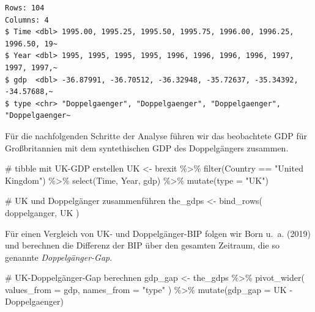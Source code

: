 \documentclass[
  a4paper,
  DIV=11,
  oneside]{scrreprt}
\newenvironment{Shaded}{\begin{snugshade}}{\end{snugshade}}
\newcommand{\AttributeTok}[1]{\textcolor[rgb]{0.40,0.45,0.13}{#1}}
\newcommand{\CommentTok}[1]{\textcolor[rgb]{0.37,0.37,0.37}{#1}}
\newcommand{\FunctionTok}[1]{\textcolor[rgb]{0.28,0.35,0.67}{#1}}
\newcommand{\NormalTok}[1]{\textcolor[rgb]{0.00,0.23,0.31}{#1}}
\newcommand{\OtherTok}[1]{\textcolor[rgb]{0.00,0.23,0.31}{#1}}
\newcommand{\SpecialCharTok}[1]{\textcolor[rgb]{0.37,0.37,0.37}{#1}}
\newcommand{\StringTok}[1]{\textcolor[rgb]{0.13,0.47,0.30}{#1}}
\begin{document}
\begin{verbatim}
Rows: 104
Columns: 4
$ Time <dbl> 1995.00, 1995.25, 1995.50, 1995.75, 1996.00, 1996.25, 1996.50, 19~
$ Year <dbl> 1995, 1995, 1995, 1995, 1996, 1996, 1996, 1996, 1997, 1997, 1997,~
$ gdp  <dbl> -36.87991, -36.70512, -36.32948, -35.72637, -35.34392, -34.57688,~
$ type <chr> "Doppelgaenger", "Doppelgaenger", "Doppelgaenger", "Doppelgaenger~
\end{verbatim}

Für die nachfolgenden Schritte der Analyse führen wir das beobachtete
GDP für Großbritannien mit dem syntethischen GDP des Doppelgängers
zusammen.

\begin{Shaded}
\begin{Highlighting}[]
\CommentTok{\# tibble mit UK{-}GDP erstellen}
\NormalTok{UK }\OtherTok{\textless{}{-}}\NormalTok{ brexit }\SpecialCharTok{\%\textgreater{}\%} 
  \FunctionTok{filter}\NormalTok{(Country }\SpecialCharTok{==} \StringTok{"United Kingdom"}\NormalTok{) }\SpecialCharTok{\%\textgreater{}\%} 
  \FunctionTok{select}\NormalTok{(Time, Year, gdp) }\SpecialCharTok{\%\textgreater{}\%}
  \FunctionTok{mutate}\NormalTok{(}\AttributeTok{type =} \StringTok{"UK"}\NormalTok{)}

\CommentTok{\# UK und Doppelgänger zusammenführen}
\NormalTok{the\_gdps }\OtherTok{\textless{}{-}} \FunctionTok{bind\_rows}\NormalTok{(}
\NormalTok{  doppelganger, UK}
\NormalTok{)}
\end{Highlighting}
\end{Shaded}

Für einen Vergleich von UK- und Doppelgänger-BIP folgen wir Born u.~a.
(2019) und berechnen die Differenz der BIP über den gesamten Zeitraum,
die so genannte \emph{Doppelgänger-Gap}.

\begin{Shaded}
\begin{Highlighting}[]
\CommentTok{\# UK{-}Doppelgänger{-}Gap berechnen}
\NormalTok{gdp\_gap }\OtherTok{\textless{}{-}}\NormalTok{ the\_gdps }\SpecialCharTok{\%\textgreater{}\%} 
  \FunctionTok{pivot\_wider}\NormalTok{(}
    \AttributeTok{values\_from =}\NormalTok{ gdp, }
    \AttributeTok{names\_from =} \StringTok{"type"}
\NormalTok{  ) }\SpecialCharTok{\%\textgreater{}\%}
  \FunctionTok{mutate}\NormalTok{(}\AttributeTok{gdp\_gap =}\NormalTok{ UK }\SpecialCharTok{{-}}\NormalTok{ Doppelgaenger)}
\end{Highlighting}
\end{Shaded}
\end{document}
